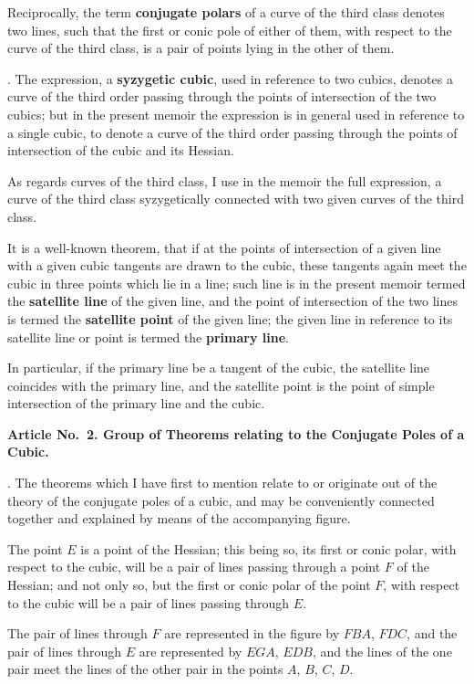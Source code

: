 \documentclass[12pt,a4paper]{article}
\theoremstyle{definition}
\begin{document}
Reciprocally, the term \textbf{conjugate polars} of a curve of the
third class denotes two lines, such that the first or conic pole
of either of them, with respect to the curve of the third class,
is a pair of points lying in the other of them.

. The expression, a \textbf{syzygetic cubic}, used in reference to
two cubics, denotes a curve of the third order passing through
the points of intersection of the two cubics; but in the present
memoir the expression is in general used in reference to a single
cubic, to denote a curve of the third order passing through the
points of intersection of the cubic and its Hessian.

As regards curves of the third class, I use in the memoir
the full expression, a curve of the third class syzygetically
connected with two given curves of the third class.

It is a well-known theorem, that if at the points of intersection
of a given line with a given cubic tangents are drawn to the
cubic, these tangents again meet the cubic in three points
which lie in a line; such line is in the present memoir termed
the \textbf{satellite line} of the given line, and the point of intersection
of the two lines is termed the \textbf{satellite point} of the given line;
the given line in reference to its satellite line or point is termed
the \textbf{primary line}.

In particular, if the primary line be a tangent of the cubic,
the satellite line coincides with the primary line, and the
satellite point is the point of simple intersection of the primary
line and the cubic.

\medskip\noindent\textbf{Article No.~2. Group of Theorems relating to the Conjugate
Poles of a Cubic.}

. The theorems which I have first to mention relate to or
originate out of the theory of the conjugate poles of a cubic,
and may be conveniently connected together and explained by
means of the accompanying figure.

The point $E$ is a point of the Hessian; this being so, its
first or conic polar, with respect to the cubic, will be a pair
of lines passing through a point $F$ of the Hessian; and not
only so, but the first or conic polar of the point $F$, with respect
to the cubic will be a pair of lines passing through $E$.

The pair of lines through $F$ are represented in the figure by
$FBA$, $FDC$, and the pair of lines through $E$ are represented
by $EGA$, $EDB$, and the lines of the one pair meet the lines
of the other pair in the points $A$, $B$, $C$, $D$.
\end{document}

